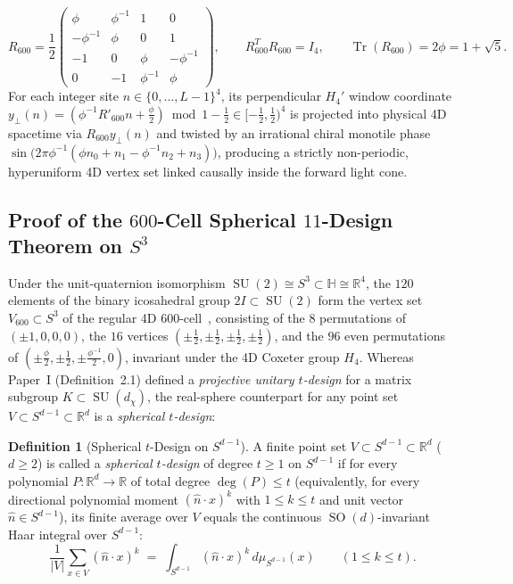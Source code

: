 \documentclass[11pt,a4paper]{article}
\theoremstyle{definition}
\newtheorem{definition}[theorem]{Definition}
\theoremstyle{remark}
\newcommand{\R}{\mathbb{R}}
\newcommand{\quat}{\mathbb{H}}
\newcommand{\Tr}{\operatorname{Tr}}
\newcommand{\SU}{\operatorname{SU}}
\newcommand{\SO}{\operatorname{SO}}
\begin{document}
\begin{enumerate}
\begin{equation}
    \label{eq:r600_matrix}
    R_{600} = \frac{1}{2}\begin{pmatrix}
    \phi & \phi^{-1} & 1 & 0 \\
    -\phi^{-1} & \phi & 0 & 1 \\
    -1 & 0 & \phi & -\phi^{-1} \\
    0 & -1 & \phi^{-1} & \phi
    \end{pmatrix}, \qquad R_{600}^T R_{600} = I_4, \qquad \Tr(R_{600}) = 2\phi = 1 + \sqrt{5}.
    \end{equation}
    For each integer site $n \in \{0, \dots, L-1\}^4$, its perpendicular $H_4'$ window coordinate $y_\perp(n) = (\phi^{-1} R'_{600} n + \frac{\phi}{2}) \bmod 1 - \frac{1}{2} \in [-\frac{1}{2}, \frac{1}{2})^4$ is projected into physical 4D spacetime via $R_{600} y_\perp(n)$ and twisted by an irrational chiral monotile phase $\sin\bigl(2\pi\phi^{-1}(\phi n_0 + n_1 - \phi^{-1}n_2 + n_3)\bigr)$, producing a strictly non-periodic, hyperuniform 4D vertex set linked causally inside the forward light cone.
\end{enumerate}

\subsection{Proof of the \texorpdfstring{$600$-Cell Spherical $11$-Design Theorem on $S^3$}{600-Cell Spherical 11-Design Theorem on S3}}

Under the unit-quaternion isomorphism $\SU(2) \cong S^3 \subset \quat \cong \R^4$, the $120$ elements of the binary icosahedral group $2I \subset \SU(2)$ form the vertex set $V_{600} \subset S^3$ of the regular 4D $600$-cell~\cite{Coxeter1974}, consisting of the $8$ permutations of $(\pm 1, 0, 0, 0)$, the $16$ vertices $(\pm\frac{1}{2}, \pm\frac{1}{2}, \pm\frac{1}{2}, \pm\frac{1}{2})$, and the $96$ even permutations of $(\pm\frac{\phi}{2}, \pm\frac{1}{2}, \pm\frac{\phi^{-1}}{2}, 0)$, invariant under the 4D Coxeter group $H_4$. Whereas Paper~I (Definition~2.1) defined a \emph{projective unitary $t$-design} for a matrix subgroup $K \subset \SU(d_\chi)$, the real-sphere counterpart for any point set $V \subset S^{d-1} \subset \R^d$ is a \emph{spherical $t$-design}:

\begin{definition}[Spherical $t$-Design on $S^{d-1}$]
\label{def:spherical_tdesign}
A finite point set $V \subset S^{d-1} \subset \R^d$ ($d \ge 2$) is called a \emph{spherical $t$-design} of degree $t \ge 1$ on $S^{d-1}$ if for every polynomial $P : \R^d \to \R$ of total degree $\deg(P) \le t$ (equivalently, for every directional polynomial moment $(\hat{n}\cdot x)^k$ with $1 \le k \le t$ and unit vector $\hat{n} \in S^{d-1}$), its finite average over $V$ equals the continuous $\SO(d)$-invariant Haar integral over $S^{d-1}$:
\begin{equation}
\label{eq:spherical_tdesign_def}
\frac{1}{|V|} \sum_{x \in V} (\hat{n} \cdot x)^k \;=\; \int_{S^{d-1}} (\hat{n} \cdot x)^k\,d\mu_{S^{d-1}}(x) \qquad (1 \le k \le t).
\end{equation}
\end{definition}
\end{document}
